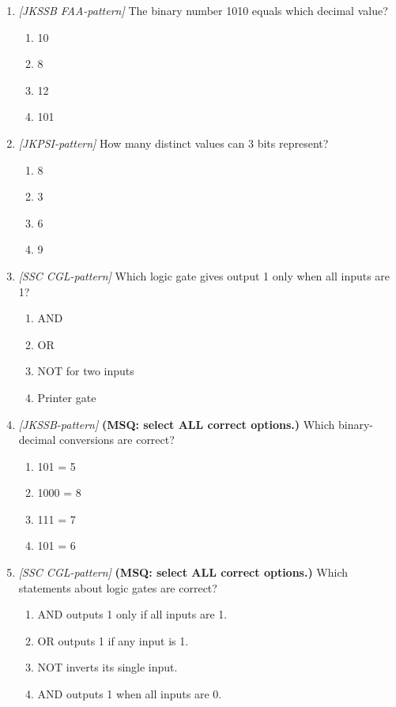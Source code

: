 \documentclass[11pt]{article}
\begin{document}
\begin{enumerate}[label=\textbf{Q\arabic*.}, leftmargin=*]
\item \textit{[JKSSB FAA-pattern]} The binary number 1010 equals which decimal value?
  \begin{enumerate}[label=\Alph*.]
    \item 10
    \item 8
    \item 12
    \item 101
  \end{enumerate}
\item \textit{[JKPSI-pattern]} How many distinct values can 3 bits represent?
  \begin{enumerate}[label=\Alph*.]
    \item 8
    \item 3
    \item 6
    \item 9
  \end{enumerate}
\item \textit{[SSC CGL-pattern]} Which logic gate gives output 1 only when all inputs are 1?
  \begin{enumerate}[label=\Alph*.]
    \item AND
    \item OR
    \item NOT for two inputs
    \item Printer gate
  \end{enumerate}
\item \textit{[JKSSB-pattern]} \textbf{(MSQ: select ALL correct options.)} Which binary-decimal conversions are correct?
  \begin{enumerate}[label=\Alph*.]
    \item 101 = 5
    \item 1000 = 8
    \item 111 = 7
    \item 101 = 6
  \end{enumerate}
\item \textit{[SSC CGL-pattern]} \textbf{(MSQ: select ALL correct options.)} Which statements about logic gates are correct?
  \begin{enumerate}[label=\Alph*.]
    \item AND outputs 1 only if all inputs are 1.
    \item OR outputs 1 if any input is 1.
    \item NOT inverts its single input.
    \item AND outputs 1 when all inputs are 0.
  \end{enumerate}
\end{enumerate}
\def\JKSSBLessonID{50}\def\JKSSBAnswers{0}
\end{document}
